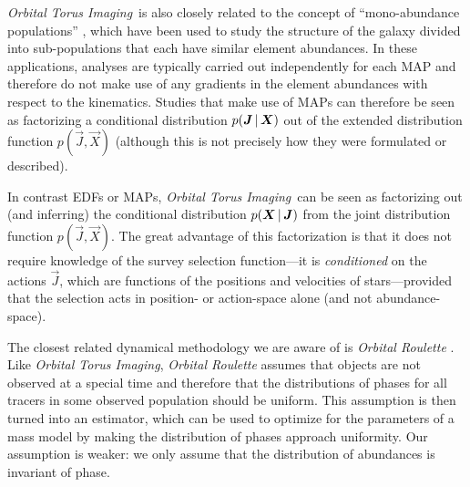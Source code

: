 \documentclass[modern]{aastex63}
\newcommand{\methodname}{\textsl{Orbital Torus Imaging}}
\begin{document}
\methodname\ is also closely related to the concept of ``mono-abundance
populations'' \citep[MAPs; e.g.,][]{Bovy:2012, Bovy:2013, Bovy:2016,
Mackereth:2020}, which have been used to study the structure of the galaxy
divided into sub-populations that each have similar element abundances.
In these applications, analyses are typically carried out independently for each
MAP and therefore do not make use of any gradients in the element abundances
with respect to the kinematics.
Studies that make use of MAPs can therefore be seen as factorizing a conditional
distribution $p(\boldsymbol{J}\,|\,\boldsymbol{X})$ out of the extended distribution function
$p(\vec{J},\vec{X})$ (although this is not precisely how they were formulated or
described).

In contrast EDFs or MAPs, \methodname\ can be seen as factorizing out (and
inferring) the conditional distribution $p(\boldsymbol{X}\,|\,\boldsymbol{J})$ from the joint
distribution function $p(\vec{J}, \vec{X})$.
The great advantage of this factorization is that it does not require knowledge
of the survey selection function---it is \emph{conditioned} on the actions
$\vec{J}$, which are functions of the positions and velocities of
stars---provided that the selection acts in position- or action-space alone (and
not abundance-space).

The closest related dynamical methodology we are aware of is \textit{Orbital
Roulette} \citep{Beloborodov:2004}.
Like \methodname, \textit{Orbital Roulette} assumes that objects are not
observed at a special time and therefore that the distributions of phases for
all tracers in some observed population should be uniform.
This assumption is then turned into an estimator, which can be used to optimize
for the parameters of a mass model by making the distribution of phases approach
uniformity.
Our assumption is weaker: we only assume that the distribution of abundances is
invariant of phase.

\end{document}
